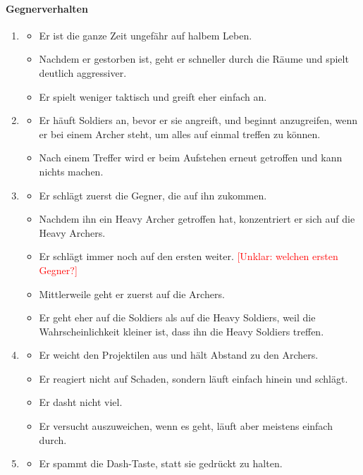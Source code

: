 \documentclass[../Main.tex]{subfiles}
\begin{document}
\paragraph{Gegnerverhalten}
\begin{enumerate}[label=\textbf{B\arabic*}, leftmargin=1.5cm, itemsep=0.8em]
\item
\begin{itemize}[nosep]
    \item Er ist die ganze Zeit ungefähr auf halbem Leben.
    \item Nachdem er gestorben ist, geht er schneller durch die Räume und spielt deutlich aggressiver.
    \item Er spielt weniger taktisch und greift eher einfach an.
\end{itemize}
\item
\begin{itemize}[nosep]
    \item Er häuft Soldiers an, bevor er sie angreift, und beginnt anzugreifen, wenn er bei einem Archer steht, um alles auf einmal treffen zu können.
    \item Nach einem Treffer wird er beim Aufstehen erneut getroffen und kann nichts machen.
\end{itemize}
\item
\begin{itemize}[nosep]
    \item Er schlägt zuerst die Gegner, die auf ihn zukommen.
    \item Nachdem ihn ein Heavy Archer getroffen hat, konzentriert er sich auf die Heavy Archers.
    \item Er schlägt immer noch auf den ersten weiter. \textcolor{red}{[Unklar: welchen ersten Gegner?]}
    \item Mittlerweile geht er zuerst auf die Archers.
    \item Er geht eher auf die Soldiers als auf die Heavy Soldiers, weil die Wahrscheinlichkeit kleiner ist, dass ihn die Heavy Soldiers treffen.
\end{itemize}
\item
\begin{itemize}[nosep]
    \item Er weicht den Projektilen aus und hält Abstand zu den Archers.
    \item Er reagiert nicht auf Schaden, sondern läuft einfach hinein und schlägt.
    \item Er dasht nicht viel.
    \item Er versucht auszuweichen, wenn es geht, läuft aber meistens einfach durch.
\end{itemize}
\item
\begin{itemize}[nosep]
    \item Er spammt die Dash-Taste, statt sie gedrückt zu halten.
\end{itemize}
\end{enumerate}
\end{document}
